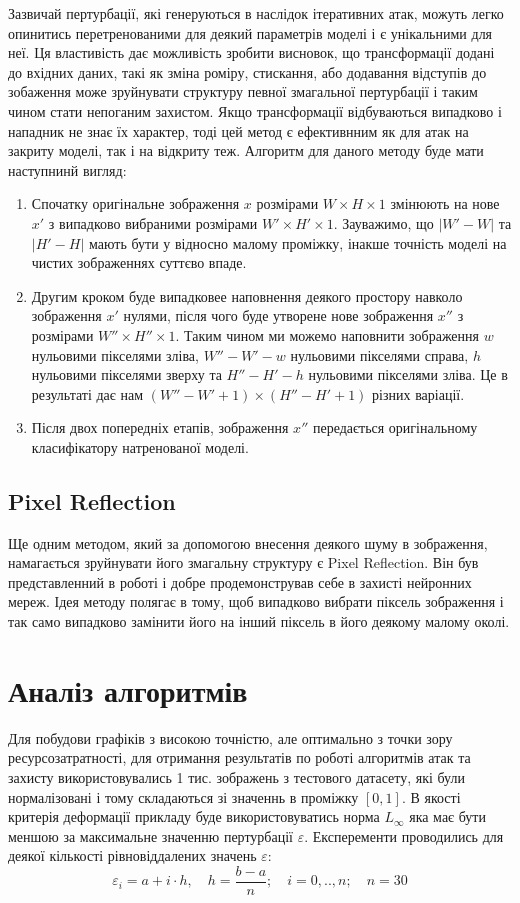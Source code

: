 \documentclass[a4paper,14pt]{extreport}
\begin{document}
	Зазвичай пертурбації, які генеруються в наслідок ітеративних атак, можуть легко опинитись перетренованими для деякий параметрів моделі і є унікальними для неї. Ця властивість дає можливість зробити висновок, що трансформації додані до вхідних даних, такі як зміна роміру, стискання, або додавання відступів до зобаження може зруйнувати структуру певної змагальної пертурбації і таким чином стати непоганим захистом. Якщо трансформації відбуваються випадково і нападник не знає їх характер, тоді цей метод є ефективнним як для атак на закриту моделі, так і на відкриту теж.
	Алгоритм для даного методу буде мати наступнинй вигляд:
	
	\begin{enumerate}
	\item Спочатку оригінальне зображення $x$ розмірами $W \times H \times 1$ змінюють на нове $x'$ з випадково вибраними розмірами $W' \times H' \times 1$. Зауважимо, що $|W' - W|$ та $|H' - H|$ мають бути у відносно малому проміжку, інакше точність моделі на чистих зображеннях суттєво впаде.
	\item Другим кроком буде випадковее наповнення деякого простору навколо зображення $x'$ нулями, після чого буде утворене нове зображення $x''$ з розмірами $W'' \times H'' \times 1$. Таким чином ми можемо наповнити зображення $w$ нульовими пікселями зліва, $W'' - W' - w$ нульовими пікселями справа, $h$ нульовими пікселями зверху та $H'' - H' - h$ нульовими пікселями зліва. Це в результаті дає нам  $(W''-W'+1) \times (H''- H'+1)$ різних варіації.
	\item Після двох попередніх етапів, зображення $x''$ передається оригінальному класифікатору натренованої моделі.
	\end{enumerate}

	\section{Pixel Reflection}
	Ще одним методом, який за допомогою внесення деякого шуму в зображення, намагається зруйнувати його змагальну структуру є Pixel Reflection. Він був представленний в роботі \textcite{prakash2018deflecting} і добре продемонстрував себе в захисті нейронних мереж. Ідея методу полягає в тому, щоб випадково вибрати піксель зображення і так само випадково замінити його на інший піксель в його деякому малому околі. 

	
	\chapter{Аналіз алгоритмів}
	Для побудови графіків з високою точністю, але оптимально з точки зору ресурсозатратності, для отримання результатів по роботі алгоритмів атак та захисту використовувались 1 тис. зображень з тестового датасету, які були нормалізовані і тому складаються зі значеннь в проміжку $[0, 1]$. В якості критерія деформації прикладу буде використовуватись норма $L_{\infty}$ яка має бути меншою за максимальне значенню пертурбації $\varepsilon$. Експеременти проводились для деякої кількості рівновіддалених значень $\varepsilon$:
	$$\varepsilon_{i}=a + i \cdot h, \quad h=\frac{b - a}{n}; \quad i=0,..,n; \quad n=30$$
\end{document}
